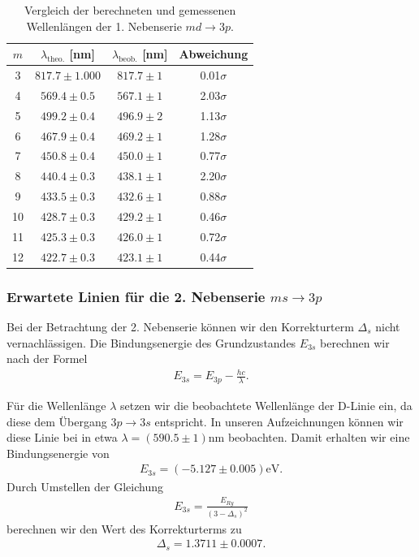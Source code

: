 \begin{table}[H]
  \centering
  \caption{Vergleich der berechneten und gemessenen Wellenlängen der 1. Nebenserie $md \to 3p$.}
  \vspace*{0.5em}
  \begin{tabular}{c c c c}
      \hline
      $m$ & $\lambda_{\text{theo.}}$ [nm] & $\lambda_{\text{beob.}}$ [nm] & Abweichung \\
      \hline
      3  & $817.7 \pm 1.000$ & $817.7 \pm 1$ & 0.01$\sigma$ \\
      4  & $569.4 \pm 0.5$ & $567.1 \pm 1$ & 2.03$\sigma$ \\
      5  & $499.2 \pm 0.4$ & $496.9 \pm 2$ & 1.13$\sigma$ \\
      6  & $467.9 \pm 0.4$ & $469.2 \pm 1$ & 1.28$\sigma$ \\
      7  & $450.8 \pm 0.4$ & $450.0 \pm 1$ & 0.77$\sigma$ \\
      8  & $440.4 \pm 0.3$ & $438.1 \pm 1$ & 2.20$\sigma$ \\
      9  & $433.5 \pm 0.3$ & $432.6 \pm 1$ & 0.88$\sigma$ \\
      10 & $428.7 \pm 0.3$ & $429.2 \pm 1$ & 0.46$\sigma$ \\
      11 & $425.3 \pm 0.3$ & $426.0 \pm 1$ & 0.72$\sigma$ \\
      12 & $422.7 \pm 0.3$ & $423.1 \pm 1$ & 0.44$\sigma$ \\
      \hline
  \end{tabular}
  \label{tab:wellenlaengen_1ns}
\end{table}

\subsubsection*{Erwartete Linien für die 2. Nebenserie $ms \to 3p$}

Bei der Betrachtung der 2. Nebenserie können wir den Korrekturterm $\Delta_s$ nicht vernachlässigen. Die Bindungsenergie des Grundzustandes $E_{3s}$ berechnen wir nach der Formel
\begin{align}
  E_{3s} = E_{3p} - \frac{hc}{\lambda}.
\end{align}

Für die Wellenlänge $\lambda$ setzen wir die beobachtete Wellenlänge der D-Linie ein, da diese dem Übergang $3p \to 3s$ entspricht. In unseren Aufzeichnungen können wir diese Linie bei in etwa $\lambda = (590.5 \pm 1) \si{\nano\meter}$ beobachten. Damit erhalten wir eine Bindungsenergie von
\begin{align}
  E_{3s} = (-5.127 \pm 0.005) \si{\electronvolt}.
\end{align}
Durch Umstellen der Gleichung
\begin{align}
  E_{3s} = \frac{E_{Ry}}{(3 - \Delta_s)^2}
\end{align}
berechnen wir den Wert des Korrekturterms zu
\begin{align}
  \Delta_s = 1.3711 \pm 0.0007.
\end{align}


